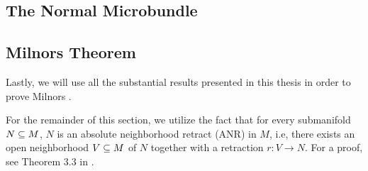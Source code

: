 \subsection*{The Normal Microbundle}\label{section::normal}   \subsection*{Milnors Theorem}\label{section::milnor} \begin{myparagraph} Lastly, we will use all the substantial results presented in this thesis in order to prove Milnors . \end{myparagraph}  \begin{myparagraph} For the remainder of this section, we utilize the fact that for every submanifold $N \subseteq{} M$, $N$ is an absolute neighborhood retract (ANR) in $M$, i.e, there exists an open neighborhood $V \subseteq{} M$ of $N$ together with a retraction $r: V \to N$. For a proof, see Theorem 3.3 in \cite{hanner}.

\end{myparagraph}  